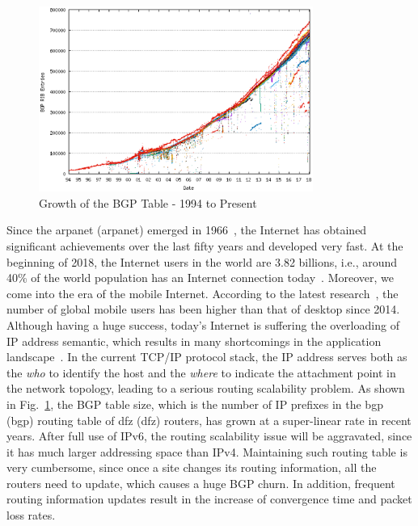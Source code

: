 \begin{figure}[t]
	\centering
	\includegraphics[width=0.8\textwidth]{Pics/Growth_BGP_Table.eps}
	\caption{Growth of the BGP Table - 1994 to Present~\cite{bgptableanalysis}}
	\label{Growth_BGP_Table}
\end{figure}
Since the \acrshort{arpanet} (\acrlong{arpanet}) emerged in 1966~\cite{marill1966toward}, the Internet has obtained significant achievements over the last fifty years and developed very fast. At the beginning of 2018, the Internet users in the world are 3.82 billions, i.e., around 40\% of the world population has an Internet connection today~\cite{InternetLiveStats}. Moreover, we come into the era of the mobile Internet. According to the latest research~\cite{SmartInsights}, the number of global mobile users has been higher than that of desktop since 2014. Although having a huge success, today's Internet is suffering the overloading of IP address semantic, which results in many shortcomings in the application landscape~\cite{feng2017locator}. In the current TCP/IP protocol stack, the IP address serves both as the \emph{who} to identify the host and the \emph{where} to indicate the attachment point in the network topology, leading to a serious routing scalability problem. As shown in Fig.~\ref{Growth_BGP_Table}, the BGP table size, which is the number of IP prefixes in the \acrshort{bgp} (\acrlong{bgp}) routing table of \acrshort{dfz} (\acrlong{dfz}) routers, has grown at a super-linear rate in recent years. After full use of IPv6, the routing scalability issue will be aggravated, since it has much larger addressing space than IPv4. Maintaining such routing table is very cumbersome, since once a site changes its routing information, all the routers need to update, which causes a huge BGP churn. In addition, frequent routing information updates result in the increase of convergence time and packet loss rates.


